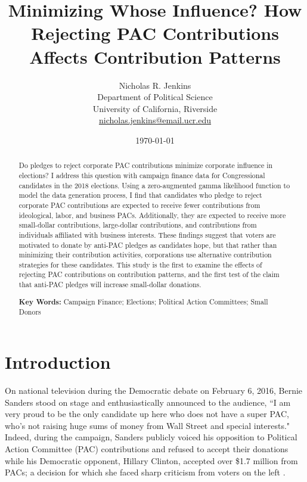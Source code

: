 \documentclass[12pt]{article}
\title{\textbf{Minimizing Whose Influence? How Rejecting PAC Contributions Affects Contribution Patterns}}
\author{Nicholas R. Jenkins \\ Department of Political Science\\ University of California, Riverside\\ \href{mailto:nicholas.jenkins@email.ucr.edu}{nicholas.jenkins@email.ucr.edu}}
\date{\today}
\begin{document}
\maketitle
\thispagestyle{empty}

\begin{abstract}

Do pledges to reject corporate PAC contributions minimize corporate influence in elections? I address this question with campaign finance data for Congressional candidates in the 2018 elections. Using a zero-augmented gamma likelihood function to model the data generation process, I find that candidates who pledge to reject corporate PAC contributions are expected to receive fewer contributions from ideological, labor, and business PACs. Additionally, they are expected to receive more small-dollar contributions, large-dollar contributions, and contributions from individuals affiliated with business interests. These findings suggest that voters are motivated to donate by anti-PAC pledges as candidates hope, but that rather than minimizing their contribution activities, corporations use alternative contribution strategies for these candidates. This study is the first to examine the effects of rejecting PAC contributions on contribution patterns, and the first test of the claim that anti-PAC pledges will increase small-dollar donations.

\medskip

\noindent \textbf{Key Words:} Campaign Finance; Elections; Political Action Committees; Small Donors

\end{abstract}

\pagebreak

\cleardoublepage
\setcounter{page}{1}

\doublespacing

\section{Introduction} \label{sec: intro}

On national television during the Democratic debate on February 6, 2016, Bernie Sanders stood on stage and enthusiastically announced to the audience, ``I am very proud to be the only candidate up here who does not have a super PAC, who’s not raising huge sums of money from Wall Street and special interests." Indeed, during the campaign, Sanders publicly voiced his opposition to Political Action Committee (PAC) contributions and refused to accept their donations while his Democratic opponent, Hillary Clinton, accepted over \$1.7 million from PACs; a decision for which she faced sharp criticism from voters on the left \citep{seitz-wald2015, bump2016}. 
\end{document}
